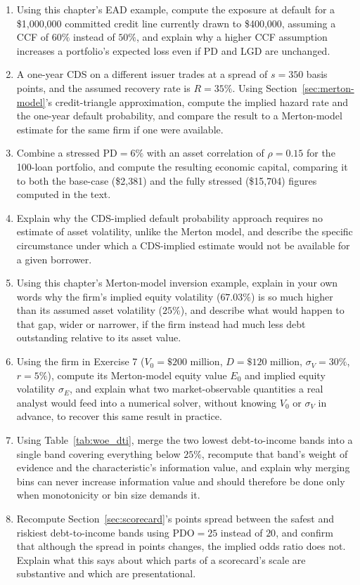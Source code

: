 \documentclass[../ai_in_finance]{subfiles}
\begin{document}
\begin{enumerate}
    \item Using this chapter's EAD example, compute the exposure at default for a \$1,000,000 committed credit line currently drawn to \$400,000, assuming a CCF of $60\%$ instead of $50\%$, and explain why a higher CCF assumption increases a portfolio's expected loss even if PD and LGD are unchanged.
    \item A one-year CDS on a different issuer trades at a spread of $s=350$ basis points, and the assumed recovery rate is $R=35\%$. Using Section~\ref{sec:merton-model}'s credit-triangle approximation, compute the implied hazard rate and the one-year default probability, and compare the result to a Merton-model estimate for the same firm if one were available.
    \item Combine a stressed $\text{PD}=6\%$ with an asset correlation of $\rho=0.15$ for the 100-loan portfolio, and compute the resulting economic capital, comparing it to both the base-case (\$2,381) and the fully stressed (\$15,704) figures computed in the text.
    \item Explain why the CDS-implied default probability approach requires no estimate of asset volatility, unlike the Merton model, and describe the specific circumstance under which a CDS-implied estimate would not be available for a given borrower.
    \item Using this chapter's Merton-model inversion example, explain in your own words why the firm's implied equity volatility ($67.03\%$) is so much higher than its assumed asset volatility ($25\%$), and describe what would happen to that gap, wider or narrower, if the firm instead had much less debt outstanding relative to its asset value.
    \item Using the firm in Exercise 7 ($V_0=\$200$ million, $D=\$120$ million, $\sigma_V=30\%$, $r=5\%$), compute its Merton-model equity value $E_0$ and implied equity volatility $\sigma_E$, and explain what two market-observable quantities a real analyst would feed into a numerical solver, without knowing $V_0$ or $\sigma_V$ in advance, to recover this same result in practice.
    \item Using Table~\ref{tab:woe_dti}, merge the two lowest debt-to-income bands into a single band covering everything below $25\%$, recompute that band's weight of evidence and the characteristic's information value, and explain why merging bins can never increase information value and should therefore be done only when monotonicity or bin size demands it.
    \item Recompute Section~\ref{sec:scorecard}'s points spread between the safest and riskiest debt-to-income bands using $\text{PDO}=25$ instead of $20$, and confirm that although the spread in points changes, the implied odds ratio does not. Explain what this says about which parts of a scorecard's scale are substantive and which are presentational.

\end{enumerate}
\end{document}

